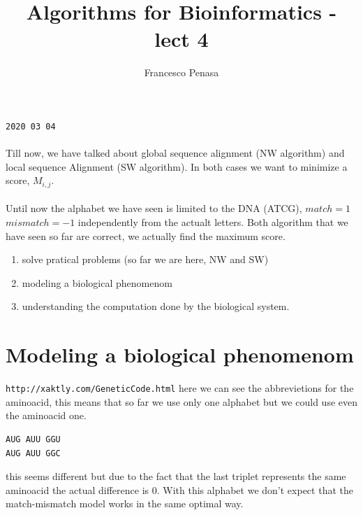 \documentclass[11pt]{article}
\begin{document}
\author{Francesco Penasa}
\title{Algorithms for Bioinformatics - lect 4}
\maketitle

\medskip

\texttt{2020 03 04}
\paragraph{} %
\label{par:}

Till now, we have talked about global sequence alignment (NW algorithm) and local sequence Alignment (SW algorithm). In both cases we want to minimize a score, $M_{i,j}$.

\paragraph{} %
\label{par:}
Until now the alphabet we have seen is limited to the DNA (ATCG), $match = 1$  $mismatch = -1$ independently from the actualt letters. Both algorithm that we have seen so far are correct, we actually find the maximum score.

\begin{enumerate}
	\item solve pratical problems (so far we are here, NW and SW)
	\item modeling a biological phenomenom	
	\item understanding the computation done by the biological system.
\end{enumerate}

\section{Modeling a biological phenomenom} %
\label{sec:modeling_a_biological_phenomenom}
\texttt{http://xaktly.com/GeneticCode.html} here we can see the abbrevietions for the aminoacid, this means that so far we use only one alphabet but we could use even the aminoacid one.

\begin{lstlisting}
AUG AUU GGU
AUG AUU GGC	
\end{lstlisting}
this seems different but due to the fact that the last triplet represents the same aminoacid the actual difference is 0.
With this alphabet we don't expect that the match-mismatch model works in the same optimal way.
\end{document}
